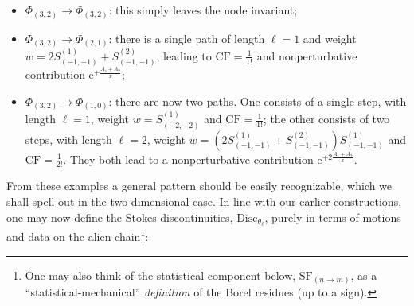\documentclass[11pt,a4paper]{article}
\def\disc{{\mathrm{Disc}}}
\newcommand{\rme}{{\mathrm{e}}}
\begin{document}
\begin{itemize}
%
\begin{itemize}
%
\item $\Phi_{(3,2)}\rightarrow\Phi_{(3,2)}$: this simply leaves the node invariant;
%
\item $\Phi_{(3,2)}\rightarrow\Phi_{(2,1)}$: there is a single path of length $\ell=1$ and weight $w = 2 S_{(-1,-1)}^{(1)} + S_{(-1,-1)}^{(2)}$, leading to $\mathrm{CF}=\frac{1}{1!}$ and nonperturbative contribution $\rme^{+\frac{A_{1}+A_{2}}{x}}$;
%
\item $\Phi_{(3,2)}\rightarrow\Phi_{(1,0)}$: there are now two paths. One consists of a single step, with length $\ell=1$, weight $w = S_{(-2,-2)}^{(1)}$ and $\mathrm{CF}=\frac{1}{1!}$; the other consists of two steps, with length $\ell=2$, weight $w = \left( 2 S_{(-1,-1)}^{(1)} + S_{(-1,-1)}^{(2)} \right) S_{(-1,-1)}^{(1)}$ and $\mathrm{CF}=\frac{1}{2!}$. They both lead to a nonperturbative contribution $\rme^{+2\frac{A_{1}+A_{2}}{x}}$.
%
\end{itemize}
%
\end{itemize}
%
\noindent
From these examples a general pattern should be easily recognizable, which we shall spell out in the two-dimensional case. In line with our earlier constructions, one may now define the Stokes discontinuities, $\disc_{\theta_{\boldsymbol{\ell}}}$, purely in terms of motions and data on the alien chain\footnote{One may also think of the statistical component below, $\mathrm{SF}_{(n \rightarrow m)}$, as a ``statistical-mechanical'' \textit{definition} of the Borel residues (up to a sign).}:
\end{document}
